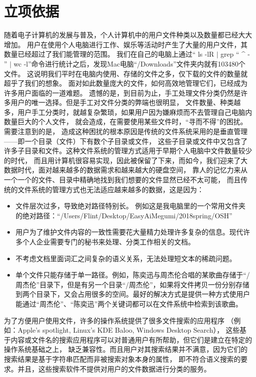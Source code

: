 \documentclass[UTF8]{ctexart}
\begin{document}
\section{立项依据}
随着电子计算机的发展与普及，个人计算机中的用户文件种类以及数量都已经大大增加。
用户在使用个人电脑进行工作、娱乐等活动时产生了大量的用户文件，其数量已经超过了我们能管理的范围。
我们在自己的电脑上通过“ ls -lR $|$ grep `` \^{} - '' $|$ wc -l”命令进行统计之后，发现Mac电脑“/Downloads”文件夹内就有103480个文件。
这说明我们平时在电脑内使用、存储的文件之多，仅下载的文件的数量就超乎了我们的想象。
面对如此数量庞大的文件，如何高效地管理它们，已经成为许多用户面临的一道难题。
遗憾的是，到目前为止，手工处理文件分类仍然是许多用户的唯一选择。但是手工对文件分类的弊端也很明显，
文件数量、种类越多，用户手工分类时，就越复杂繁琐，如果用户因为嫌麻烦而不去管理自己电脑内数量巨大的个人文件，
就会造成，在需要使用某些文件时，“寻而不得”的困扰。需要注意到的是，
造成这种困扰的根本原因是传统的文件系统采用的是垂直管理——即一个目录（文件）下有数个子目录或文件，
这些子目录或文件中又包含了许多子目录和文件。这种文件系统的管理方式适用于早期个人电脑中文件数量较少的时代，
而且用计算机很容易实现，因此被保留了下来，而如今，我们迎来了大数据时代，面对越来越多的数据需求和越来越大的硬盘空间，
靠人的记忆力来从一个一个的文件、目录中精确地找到我们想要的文件显然已经不太可能，
而且传统的文件系统的管理方式也无法适应越来越多的数据，这是因为：
\begin{itemize}
  \item 文件层次过多，导致绝对路径特别长。
  例如这是我电脑里的一个常用文件夹的绝对路径：``/Users/Flint/Desktop/EasyAiMegumi/2018spring/OSH''
  \item 用户为了维护文件内容的一致性需要花大量精力处理许多复杂的信息。现代许多个人企业需要专门的秘书来处理、分类工作相关的文档。
  \item 不考虑文档里面词汇之间复杂的语义关系，无法处理短文本的稀疏问题。
  \item 单个文件只能存储于单一路径。例如，陈奕迅与周杰伦合唱的某歌曲存储于“/周杰伦”目录下，但是有另一个目录“/周杰伦”，如果将文件拷贝一份分别存储到两个目录下，又会占用很多的空间。最好的解决方式是提供一种方式使用户能通过“周杰伦”、“陈奕迅”两个关键词都可以在文件系统中检索到该歌曲。
\end{itemize}

为了方便用户使用文件，许多的操作系统提供了很多文件搜索的应用程序
（例如：Apple’s spotlight, Linux’s KDE Baloo, Windows Desktop Search），
这些基于内容或文件名的搜索应用程序可以对普通用户有所帮助，但它们是建立在特定的操作系统基础之上，
缺乏兼容性。而且用户对其搜索结果并不满意，因为它们的搜索结果是基于字符串匹配而非被搜索对象本身的属性，
即不符合语义搜索的要求。并且，这些搜索软件不提供对用户的文件数据进行分类的服务。
\end{document}
